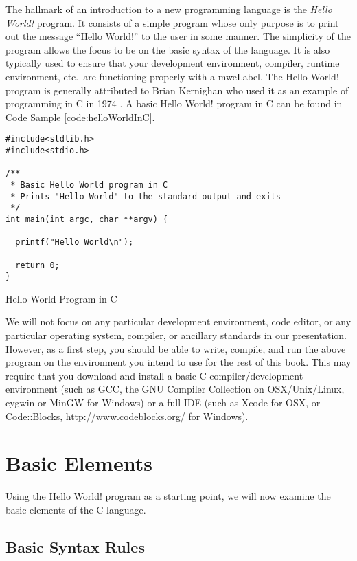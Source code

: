 The hallmark of an introduction to a new programming language is 
the \emph{Hello World!} program.  It consists of a simple program whose 
only purpose is to print out the message ``Hello World!'' to the user 
in some manner.  The simplicity of the program allows the
focus to be on the basic syntax of the language.  It is also typically 
used to ensure that your development environment, compiler, 
runtime environment, etc.\ are functioning 
properly with a \gls{mweLabel}.  The Hello World! program is generally 
attributed to Brian Kernighan who used it as an example of programming 
in C in 1974 \cite{Kernighan:1974}. A basic Hello World! program in C 
can be found in Code Sample \ref{code:helloWorldInC}.

\begin{listing}
\begin{verbatim}
#include<stdlib.h>
#include<stdio.h>

/**
 * Basic Hello World program in C
 * Prints "Hello World" to the standard output and exits
 */
int main(int argc, char **argv) {

  printf("Hello World\n");

  return 0;
}
\end{verbatim}
\caption{Hello World Program in C}
\label{code:helloWorldInC}
\end{listing}

We will not focus on any particular development environment, code editor, or any 
particular operating system, compiler, or ancillary standards in our presentation.  However,
as a first step, you should be able to write, compile, and run the above program on the
environment you intend to use for the rest of this book.  This may require that you download
and install a basic C compiler/development environment (such as GCC, the GNU Compiler 
Collection on OSX/Unix/Linux, cygwin or MinGW for Windows) or a full IDE (such as Xcode 
for OSX, or Code::Blocks, \url{http://www.codeblocks.org/} for Windows).

\section{Basic Elements}

Using the Hello World! program as a starting point, we will now examine the basic
elements of the C language.

\subsection{Basic Syntax Rules}

